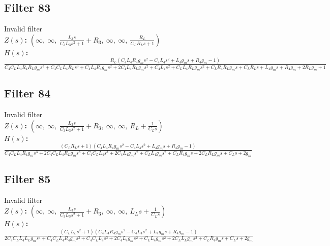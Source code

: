 \documentclass{article}
\begin{document}
\subsection*{Filter 83}
Invalid filter \\ 
\textbf{$Z(s)$:} $\left( \infty, \  \infty, \  \frac{L_{3} s}{C_{3} L_{3} s^{2} + 1} + R_{3}, \  \infty, \  \infty, \  \frac{R_{L}}{C_{L} R_{L} s + 1}\right)$ \\ 
\textbf{$H(s)$:} $\frac{R_{L} \left(C_{4} L_{4} R_{4} g_{m} s^{2} - C_{4} L_{4} s^{2} + L_{4} g_{m} s + R_{4} g_{m} - 1\right)}{C_{4} C_{L} L_{4} R_{4} R_{L} g_{m} s^{3} + C_{4} C_{L} L_{4} R_{L} s^{3} + C_{4} L_{4} R_{4} g_{m} s^{2} + 2 C_{4} L_{4} R_{L} g_{m} s^{2} + C_{4} L_{4} s^{2} + C_{L} L_{4} R_{L} g_{m} s^{2} + C_{L} R_{4} R_{L} g_{m} s + C_{L} R_{L} s + L_{4} g_{m} s + R_{4} g_{m} + 2 R_{L} g_{m} + 1}$ \\ 
\subsection*{Filter 84}
Invalid filter \\ 
\textbf{$Z(s)$:} $\left( \infty, \  \infty, \  \frac{L_{3} s}{C_{3} L_{3} s^{2} + 1} + R_{3}, \  \infty, \  \infty, \  R_{L} + \frac{1}{C_{L} s}\right)$ \\ 
\textbf{$H(s)$:} $\frac{\left(C_{L} R_{L} s + 1\right) \left(C_{4} L_{4} R_{4} g_{m} s^{2} - C_{4} L_{4} s^{2} + L_{4} g_{m} s + R_{4} g_{m} - 1\right)}{C_{4} C_{L} L_{4} R_{4} g_{m} s^{3} + 2 C_{4} C_{L} L_{4} R_{L} g_{m} s^{3} + C_{4} C_{L} L_{4} s^{3} + 2 C_{4} L_{4} g_{m} s^{2} + C_{L} L_{4} g_{m} s^{2} + C_{L} R_{4} g_{m} s + 2 C_{L} R_{L} g_{m} s + C_{L} s + 2 g_{m}}$ \\ 
\subsection*{Filter 85}
Invalid filter \\ 
\textbf{$Z(s)$:} $\left( \infty, \  \infty, \  \frac{L_{3} s}{C_{3} L_{3} s^{2} + 1} + R_{3}, \  \infty, \  \infty, \  L_{L} s + \frac{1}{C_{L} s}\right)$ \\ 
\textbf{$H(s)$:} $\frac{\left(C_{L} L_{L} s^{2} + 1\right) \left(C_{4} L_{4} R_{4} g_{m} s^{2} - C_{4} L_{4} s^{2} + L_{4} g_{m} s + R_{4} g_{m} - 1\right)}{2 C_{4} C_{L} L_{4} L_{L} g_{m} s^{4} + C_{4} C_{L} L_{4} R_{4} g_{m} s^{3} + C_{4} C_{L} L_{4} s^{3} + 2 C_{4} L_{4} g_{m} s^{2} + C_{L} L_{4} g_{m} s^{2} + 2 C_{L} L_{L} g_{m} s^{2} + C_{L} R_{4} g_{m} s + C_{L} s + 2 g_{m}}$ \\ 
\end{document}
